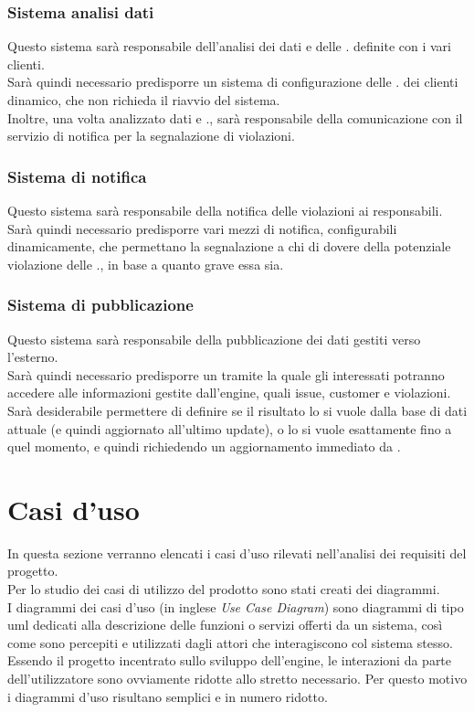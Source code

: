 		\subsubsection{Sistema analisi dati}
			Questo sistema sarà responsabile dell'analisi dei dati e delle . definite con i vari clienti. \\
			Sarà quindi necessario predisporre un sistema di configurazione delle . dei clienti dinamico, che non richieda il riavvio del sistema. \\
			Inoltre, una volta analizzato dati e ., sarà responsabile  della comunicazione con il servizio di notifica per la segnalazione di violazioni.
		\subsubsection{Sistema di notifica}
			Questo sistema sarà responsabile della notifica delle violazioni ai responsabili.\\
			Sarà quindi necessario predisporre vari mezzi di notifica, configurabili dinamicamente, che permettano la segnalazione a chi di dovere della potenziale violazione delle ., in base a quanto grave essa sia.
		\subsubsection{Sistema di pubblicazione}
			Questo sistema sarà responsabile della pubblicazione dei dati gestiti verso l'esterno.\\
			Sarà quindi necessario predisporre un  tramite la quale gli interessati potranno accedere alle informazioni gestite dall'engine, quali issue, customer e violazioni. \\
			Sarà desiderabile permettere di definire se il risultato lo si vuole dalla base di dati attuale (e quindi aggiornato all'ultimo update), o lo si vuole esattamente fino a quel momento, e quindi richiedendo un aggiornamento immediato da .
		






\section{Casi d'uso}

In questa sezione verranno elencati i casi d'uso rilevati nell'analisi dei requisiti del progetto.\\
Per lo studio dei casi di utilizzo del prodotto sono stati creati dei diagrammi.\\
I diagrammi dei casi d'uso (in inglese \emph{Use Case Diagram}) sono diagrammi di tipo \gls{uml} dedicati alla descrizione delle funzioni o servizi offerti da un sistema, così come sono percepiti e utilizzati dagli attori che interagiscono col sistema stesso.
Essendo il progetto incentrato sullo sviluppo dell'engine, le interazioni da parte dell'utilizzatore sono ovviamente ridotte allo stretto necessario. Per questo motivo i diagrammi d'uso risultano semplici e in numero ridotto.\\

